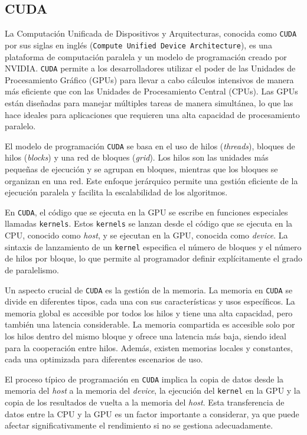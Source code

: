 \subsection{CUDA}
La Computación Unificada de Dispositivos y Arquitecturas, conocida como \texttt{CUDA} por sus siglas en inglés (\texttt{Compute Unified Device Architecture}), es una plataforma de computación paralela y un modelo de programación creado por NVIDIA. \texttt{CUDA} permite a los desarrolladores utilizar el poder de las Unidades de Procesamiento Gráfico (GPUs) para llevar a cabo cálculos intensivos de manera más eficiente que con las Unidades de Procesamiento Central (CPUs). Las GPUs están diseñadas para manejar múltiples tareas de manera simultánea, lo que las hace ideales para aplicaciones que requieren una alta capacidad de procesamiento paralelo.\cite*{chen-gpu-polymerization-2011}

El modelo de programación \texttt{CUDA} se basa en el uso de hilos (\emph{threads}), bloques de hilos (\emph{blocks}) y una red de bloques (\emph{grid}). Los hilos son las unidades más pequeñas de ejecución y se agrupan en bloques, mientras que los bloques se organizan en una red. Este enfoque jerárquico permite una gestión eficiente de la ejecución paralela y facilita la escalabilidad de los algoritmos.\cite*{nvidia-cuda-guide-no-date}

En \texttt{CUDA}, el código que se ejecuta en la GPU se escribe en funciones especiales llamadas \texttt{kernels}. Estos \texttt{kernels} se lanzan desde el código que se ejecuta en la CPU, conocido como \emph{host}, y se ejecutan en la GPU, conocida como \emph{device}. La sintaxis de lanzamiento de un \texttt{kernel} especifica el número de bloques y el número de hilos por bloque, lo que permite al programador definir explícitamente el grado de paralelismo.

Un aspecto crucial de \texttt{CUDA} es la gestión de la memoria. La memoria en \texttt{CUDA} se divide en diferentes tipos, cada una con sus características y usos específicos. La memoria global es accesible por todos los hilos y tiene una alta capacidad, pero también una latencia considerable. La memoria compartida es accesible solo por los hilos dentro del mismo bloque y ofrece una latencia más baja, siendo ideal para la cooperación entre hilos. Además, existen memorias locales y constantes, cada una optimizada para diferentes escenarios de uso.

El proceso típico de programación en \texttt{CUDA} implica la copia de datos desde la memoria del \emph{host} a la memoria del \emph{device}, la ejecución del \texttt{kernel} en la GPU y la copia de los resultados de vuelta a la memoria del \emph{host}. Esta transferencia de datos entre la CPU y la GPU es un factor importante a considerar, ya que puede afectar significativamente el rendimiento si no se gestiona adecuadamente.

